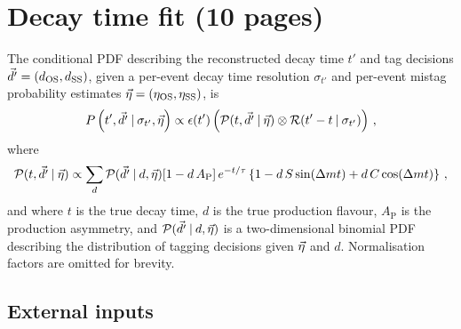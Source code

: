 
\section{Decay time fit (10 pages)}
\label{sec:b02dd:decaytimefit}

The conditional PDF describing the reconstructed decay time $t'$ and tag
decisions $\vec{d'} = (d_{\text{OS}}, d_{\text{SS}})$, given a per-event decay time resolution
$\sigma_{t'}$ and per-event mistag probability estimates $\vec{\eta} = (\eta_{\text{OS}},
\eta_{\text{SS}})$, is
%
\begin{equation}\label{eq:fullpdf}
  P\left(t',\vec{d'}\:\vert\: \sigma_{t'},\vec{\eta}\right)
  \propto \epsilon(t') \left(\mathcal{P}(t,\vec{d'}\:\vert\: \vec{\eta})
    \otimes \mathcal{R}(t'-t\:\vert\: \sigma_{t'})\right)\,,
\end{equation}
%
where
\begin{equation}
  \mathcal{P}(t,\vec{d'}\:\vert\: \vec{\eta}) \\
  \propto \sum_{d} \mathcal{P}(\vec{d'} \:\vert\: d,\vec{\eta})
      [1 - d\, A_\text{P}] \,
      e^{-t/\tau}\left\{1 - d\, S \sin({\Delta m} t) + d\, C \cos({\Delta m} t)\right\}\,,
\end{equation}
and where $t$ is the true decay time, $d$ is the true production flavour,
$A_\text{P}$ is the production asymmetry, and $\mathcal{P}(\vec{d'} \:\vert\:
d,\vec{\eta})$ is a two-dimensional binomial PDF describing the distribution
of tagging decisions given $\vec{\eta}$ and $d$. Normalisation factors are omitted for brevity.



\FloatBarrier


\FloatBarrier
\subsection{External inputs}
\label{sec:b02dd:decaytimefit:constraints}

